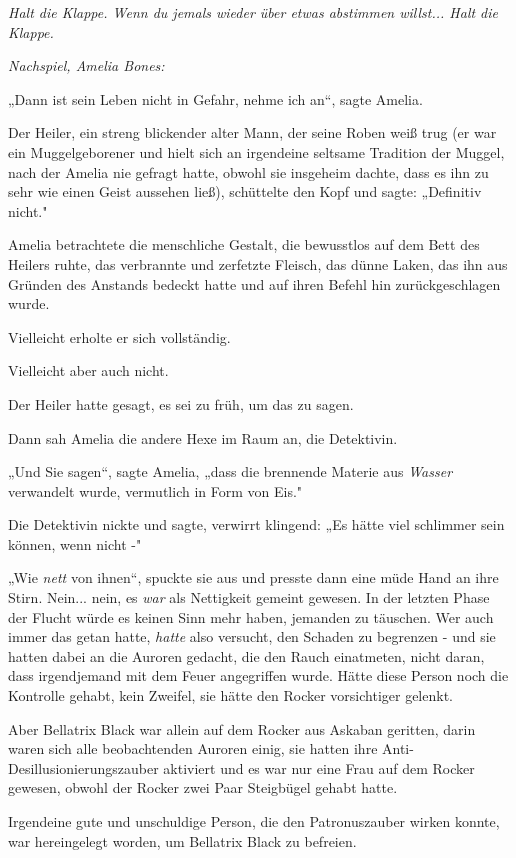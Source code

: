 {\emph{\emph{Halt die Klappe. Wenn du jemals wieder über etwas abstimmen willst... Halt die Klappe.}}

\emph{\emph{Nachspiel, Amelia Bones:}}

„Dann ist sein Leben nicht in Gefahr, nehme ich an“, sagte Amelia.

Der Heiler, ein streng blickender alter Mann, der seine Roben weiß trug (er war ein Muggelgeborener und hielt sich an irgendeine seltsame Tradition der Muggel, nach der Amelia nie gefragt hatte, obwohl sie insgeheim dachte, dass es ihn zu sehr wie einen Geist aussehen ließ), schüttelte den Kopf und sagte: „Definitiv nicht."

Amelia betrachtete die menschliche Gestalt, die bewusstlos auf dem Bett des Heilers ruhte, das verbrannte und zerfetzte Fleisch, das dünne Laken, das ihn aus Gründen des Anstands bedeckt hatte und auf ihren Befehl hin zurückgeschlagen wurde.

Vielleicht erholte er sich vollständig.

Vielleicht aber auch nicht.

Der Heiler hatte gesagt, es sei zu früh, um das zu sagen.

Dann sah Amelia die andere Hexe im Raum an, die Detektivin.

„Und Sie sagen“, sagte Amelia, „dass die brennende Materie aus \emph{Wasser} verwandelt wurde, vermutlich in Form von Eis."

Die Detektivin nickte und sagte, verwirrt klingend: „Es hätte viel schlimmer sein können, wenn nicht -"

„Wie \emph{nett} von ihnen“, spuckte sie aus und presste dann eine müde Hand an ihre Stirn. Nein... nein, es \emph{war} als Nettigkeit gemeint gewesen. In der letzten Phase der Flucht würde es keinen Sinn mehr haben, jemanden zu täuschen. Wer auch immer das getan hatte, \emph{hatte} also versucht, den Schaden zu begrenzen - und sie hatten dabei an die Auroren gedacht, die den Rauch einatmeten, nicht daran, dass irgendjemand mit dem Feuer angegriffen wurde. Hätte diese Person noch die Kontrolle gehabt, kein Zweifel, sie hätte den Rocker vorsichtiger gelenkt.

Aber Bellatrix Black war allein auf dem Rocker aus Askaban geritten, darin waren sich alle beobachtenden Auroren einig, sie hatten ihre Anti-Desillusionierungszauber aktiviert und es war nur eine Frau auf dem Rocker gewesen, obwohl der Rocker zwei Paar Steigbügel gehabt hatte.

Irgendeine gute und unschuldige Person, die den Patronuszauber wirken konnte, war hereingelegt worden, um Bellatrix Black zu befreien.

}
